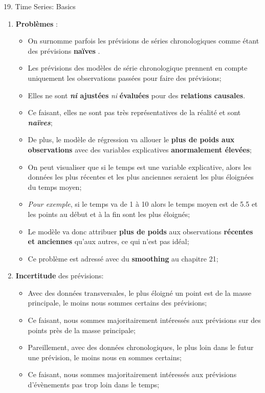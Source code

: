 \documentclass[12pt, titlepage, french]{report}
\begin{document}
\begin{CHPT_SUMM}[label = {timeseries19}]{19. Time Series: Basics}
\begin{enumerate}
\begin{itemize}
		\texttt{[image: src/time-series-plots.png]}
		\end{itemize}
	\item[]	\textbf{Problèmes} :
		\begin{itemize}
		\item	On surnomme parfois les prévisions de séries chronologiques comme étant des prévisions \og \textbf{naïves} \fg{}. 
		\item[]	Les prévisions des modèles de série chronologique prennent en compte uniquement les observations passées pour faire des prévisions;
		\item[]	Elles ne sont \textbf{\textit{ni} ajustées} \textit{ni} \textbf{évaluées} pour des \textbf{relations causales}. 
		\item[]	Ce faisant, elles ne sont pas très représentatives de la réalité et sont \textbf{\textit{naïves}};
		\item	De plus, le modèle de régression va allouer le \textbf{plus de poids aux observations} avec des variables explicatives \textbf{anormalement élevées};
		\item[]	On peut visualiser que si le temps est une variable explicative, alors les données les plus récentes et les plus anciennes seraient les plus éloignées du temps moyen;
		\item[]	\textit{Pour exemple}, si le temps va de 1 à 10 alors le temps moyen est de 5.5 et les points au début et à la fin sont les plus éloignés;
		\item[]	Le modèle va donc attribuer \textbf{plus de poids} aux observations \textbf{récentes et anciennes} qu'aux autres, ce qui n'est pas idéal;
		\item[]	Ce problème est adressé avec du \textbf{smoothing} au chapitre 21;		
		\end{itemize} 
	\item[]	\textbf{Incertitude} des prévisions:
		\begin{itemize}
		\item	Avec des données transversales, le plus éloigné un point est de la masse principale, le moins nous sommes certains des prévisions;
		\item[]	Ce faisant, nous sommes majoritairement intéressés aux prévisions sur des points près de la masse principale;
		\item 	Pareillement, avec des données chronologiques, le plus loin dans le futur une prévision, le moins nous en sommes certains;
		\item[]	Ce faisant, nous sommes majoritairement intéressés aux prévisions d'évènements pas trop loin dans le temps; 

\end{itemize}
\end{enumerate}
\end{CHPT_SUMM}
\end{document}
